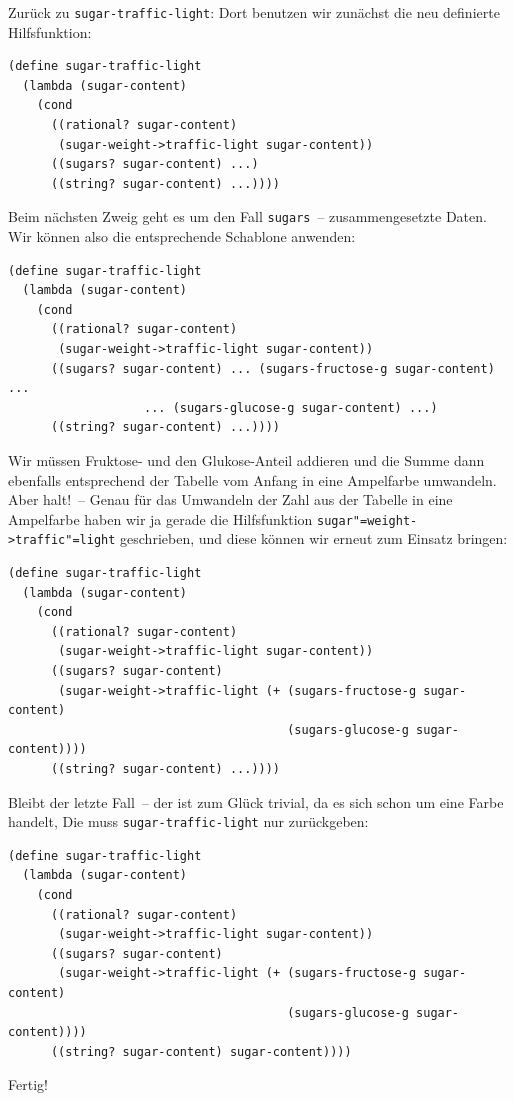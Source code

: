%
Zurück zu \lstinline{sugar-traffic-light}: Dort benutzen wir zunächst die
neu definierte Hilfsfunktion:
%
\begin{lstlisting}
(define sugar-traffic-light
  (lambda (sugar-content)
    (cond
      ((rational? sugar-content)
       (sugar-weight->traffic-light sugar-content))
      ((sugars? sugar-content) ...)
      ((string? sugar-content) ...))))
\end{lstlisting}         
%
Beim nächsten Zweig geht es um den Fall \lstinline{sugars}~--
zusammengesetzte Daten.  Wir können also die entsprechende Schablone
anwenden:
%
\begin{lstlisting}
(define sugar-traffic-light
  (lambda (sugar-content)
    (cond
      ((rational? sugar-content)
       (sugar-weight->traffic-light sugar-content))
      ((sugars? sugar-content) ... (sugars-fructose-g sugar-content) ...
                   ... (sugars-glucose-g sugar-content) ...)
      ((string? sugar-content) ...))))
\end{lstlisting}         
%
Wir müssen Fruktose- und den Glukose-Anteil addieren und die Summe
dann ebenfalls entsprechend der Tabelle vom Anfang in eine Ampelfarbe
umwandeln.  Aber halt!~-- Genau für das Umwandeln der Zahl aus der
Tabelle in eine Ampelfarbe haben wir ja gerade die Hilfsfunktion
\lstinline{sugar"=weight->traffic"=light} geschrieben, und diese können wir
erneut zum Einsatz bringen:
%
\begin{lstlisting}
(define sugar-traffic-light
  (lambda (sugar-content)
    (cond
      ((rational? sugar-content)
       (sugar-weight->traffic-light sugar-content))
      ((sugars? sugar-content)
       (sugar-weight->traffic-light (+ (sugars-fructose-g sugar-content)
                                       (sugars-glucose-g sugar-content))))
      ((string? sugar-content) ...))))
\end{lstlisting}         
%
Bleibt der letzte Fall~-- der ist zum Glück trivial, da es sich schon
um eine Farbe handelt, Die muss \lstinline{sugar-traffic-light} nur
zurückgeben:
%
\begin{lstlisting}
(define sugar-traffic-light
  (lambda (sugar-content)
    (cond
      ((rational? sugar-content)
       (sugar-weight->traffic-light sugar-content))
      ((sugars? sugar-content)
       (sugar-weight->traffic-light (+ (sugars-fructose-g sugar-content)
                                       (sugars-glucose-g sugar-content))))
      ((string? sugar-content) sugar-content))))
\end{lstlisting}         
%
Fertig!

